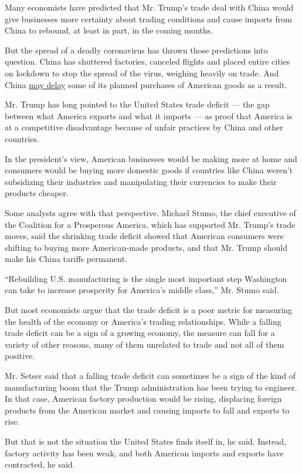 Many economists have predicted that Mr. Trump's trade deal with China
would give businesses more certainty about trading conditions and cause
imports from China to rebound, at least in part, in the coming months.

But the spread of a deadly coronavirus has thrown those predictions into
question. China has shuttered factories, canceled flights and placed
entire cities on lockdown to stop the spread of the virus, weighing
heavily on trade. And China
\href{https://www.nytimes3xbfgragh.onion/2020/02/03/business/economy/coronavirus-china-trade-economy.html}{may
delay} some of its planned purchases of American goods as a result.

Mr. Trump has long pointed to the United States trade deficit --- the
gap between what America exports and what it imports --- as proof that
America is at a competitive disadvantage because of unfair practices by
China and other countries.

In the president's view, American businesses would be making more at
home and consumers would be buying more domestic goods if countries like
China weren't subsidizing their industries and manipulating their
currencies to make their products cheaper.

Some analysts agree with that perspective. Michael Stumo, the chief
executive of the Coalition for a Prosperous America, which has supported
Mr. Trump's trade moves, said the shrinking trade deficit showed that
American consumers were shifting to buying more American-made products,
and that Mr. Trump should make his China tariffs permanent.

``Rebuilding U.S. manufacturing is the single most important step
Washington can take to increase prosperity for America's middle class,''
Mr. Stumo said.

But most economists argue that the trade deficit is a poor metric for
measuring the health of the economy or America's trading relationships.
While a falling trade deficit can be a sign of a growing economy, the
measure can fall for a variety of other reasons, many of them unrelated
to trade and not all of them positive.

Mr. Setser said that a falling trade deficit can sometimes be a sign of
the kind of manufacturing boom that the Trump administration has been
trying to engineer. In that case, American factory production would be
rising, displacing foreign products from the American market and causing
imports to fall and exports to rise.

But that is not the situation the United States finds itself in, he
said. Instead, factory activity has been weak, and both American imports
and exports have contracted, he said.

